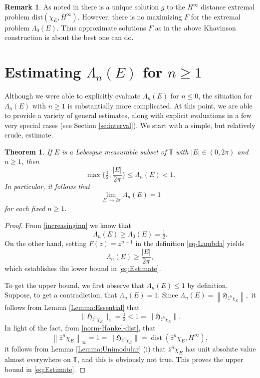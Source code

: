 \documentclass[11pt,reqno]{amsart}
\numberwithin{equation}{section}
\theoremstyle{plain}
\newtheorem{Theorem}[equation]{Theorem}
\theoremstyle{definition}
\newtheorem{Remark}[equation]{Remark}
\begin{document}
\begin{Remark}
As noted in \cite[VII.A.2]{Koosis} there is a unique solution $g$ to the $H^{\infty}$ distance extremal problem $\mbox{dist}(\chi_{E}, H^{\infty})$. However, there is no maximizing $F$ for the extremal problem $\Lambda_{0}(E)$. Thus approximate solutions $F$ as in the above Khavinson construction is about the best one can do. 
\end{Remark}

\section{Estimating $\Lambda_n(E)$ for $n \geq 1$}\label{Section:Positive}
	Although we were able to explicitly evaluate $\Lambda_{n}(E)$
	for $n \leq 0$, the situation for $\Lambda_n(E)$ with $n \geq 1$ is substantially more
	complicated.  At this point, we are able to provide a variety of general estimates, along with
	explicit evaluations in a few very special cases (see Section \ref{se:interval}). We start with a simple, but relatively crude, estimate. 
	
	

	
	
	\begin{Theorem}\label{Theorem:Estimate}
		If $E$ is a Lebesgue measurable subset of ${\mathbb{T}}$ with $|E| \in (0, 2 \pi)$ and $n \geq 1$, then 
		\begin{equation}\label{eq:Estimate}
			\max\big\{ \tfrac{1}{2}, \frac{|E|}{2 \pi} \big\} \leq \Lambda_n(E)<1.
		\end{equation}
		In particular, it follows that
		\begin{equation*}
			\lim_{|E|\to 2\pi} \Lambda_n(E) = 1
		\end{equation*}
		for each fixed $n \geq 1$.
	\end{Theorem}

	\begin{proof}
	From \eqref{increasinginn} we know that 
			$$\Lambda_n(E) \geq \Lambda_0(E) = \tfrac{1}{2}.$$
		 On the other hand, setting $F(z) = z^{n-1}$ in the definition
		\eqref{eq-Lambda} yields $$\Lambda_n(E) \geq \frac{|E|}{2 \pi},$$ which establishes the lower bound
		in \eqref{eq:Estimate}.
		
		To get the upper bound, we  first observe that $\Lambda_n(E) \leq 1$ by definition. Suppose, to get a contradiction,
		that $\Lambda_n(E)=1$.  Since 
		$\Lambda_n(E) = {\left\| {{\mathfrak{H}}_{\bar z^n \chi_E}} \right\|},$
		it follows from Lemma \ref{Lemma:Essential} that
		$$\|{\mathfrak{H}}_{\bar z^n \chi_E}\|_e = \tfrac{1}{2} < 1 = \|{\mathfrak{H}}_{\bar z^n \chi_E}\|.$$
		In light of the fact, from \eqref{norm-Hankel-dist}, that $${\left\| {\bar z^n \chi_E} \right\|}_{\infty} = 1 = \|{\mathfrak{H}}_{\bar z^n \chi_E}\| = {\operatorname{dist}}(\bar z^n \chi_E,H^{\infty}),$$
		it follows from Lemma \ref{Lemma:Unimodular} (i) that
		$\bar z^n \chi_E$ has unit absolute value almost everywhere on ${\mathbb{T}}$, and this is obviously not true. This proves the
		upper bound in \eqref{eq:Estimate}.
	\end{proof}
	
\end{document}
